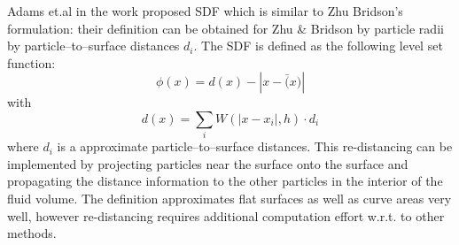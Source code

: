 Adams et.al in the work \cite{AdamsEtAl} proposed SDF which is similar to Zhu Bridson's formulation: their definition can be obtained for Zhu \& Bridson by particle radii by particle–to–surface distances $d_i$. The SDF is defined as the following level set function:
\begin{equation}
	\phi(x) = d(x) - |x - \bar(x)|
\end{equation}
with
\begin{equation}
	d(x) = \sum_i W(|x - x_i|,h)\cdot d_i
\end{equation}
where $d_i$ is a approximate particle–to–surface distances. This re-distancing can be implemented by projecting particles near the surface onto the surface and propagating the distance information to the other particles in the interior of the fluid volume. The definition approximates flat surfaces as well as curve areas very well, however re-distancing requires additional computation effort w.r.t. to other methods.

